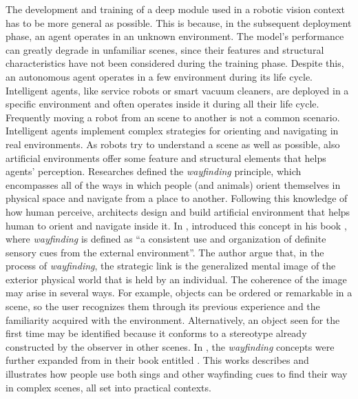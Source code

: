 The development and training of a deep module used in a robotic vision context has to be more general as possible. This is because, in the subsequent deployment phase, an agent operates in an unknown environment. The model's performance can greatly degrade in unfamiliar scenes, since their features and structural characteristics have not been considered during the training phase. Despite this, an autonomous agent operates in a few environment during its life cycle. Intelligent agents, like service robots or smart vacuum cleaners, are deployed in a specific environment and often operates inside it during all their life cycle. Frequently moving a robot from an scene to another is not a common scenario. Intelligent agents implement complex strategies for orienting and navigating in real environments. As robots try to understand a scene as well as possible, also artificial environments offer some feature and structural elements that helps agents' perception. Researches defined the \textit{wayfinding} principle, which encompasses all of the ways in which people (and animals) orient themselves in physical space and navigate from a place to another. Following this knowledge of how human perceive, architects design and build artificial environment that helps human to orient and navigate inside it. In \citeyear{imageofcity}, \citeauthor{imageofcity} introduced this concept in his book , where \textit{wayfinding} is defined as ``a consistent use and organization of definite sensory cues from the external environment''.  The author argue that, in the process of \textit{wayfinding}, the strategic link is the generalized mental image of the exterior physical world that is held by an individual. The coherence of the image may arise in several ways. For example, objects can be ordered or remarkable in a scene, so the user recognizes them through its previous experience and the familiarity acquired with the environment. Alternatively, an object seen for the first time may be identified because it
conforms to a stereotype already constructed by the observer in other scenes. In \citeyear{wayfinding}, the \textit{wayfinding} concepts were further expanded from \citeauthor{wayfinding} in their book entitled  \cite{wayfinding}. This works describes and illustrates how people use both sings and other wayfinding cues to find their way in complex scenes, all set into practical contexts. 
